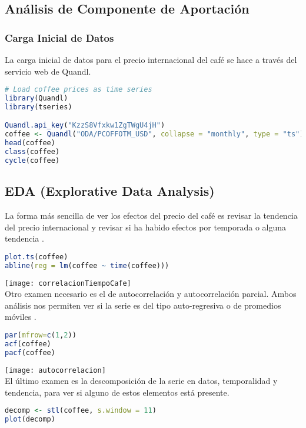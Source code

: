 \subsection{Análisis de Componente de Aportación}

\subsubsection{Carga Inicial de Datos}
La carga inicial de datos para el precio internacional del café se hace a través del servicio web de Quandl.

\begin{lstlisting}[language=R]
# Load coffee prices as time series
library(Quandl)
library(tseries)

Quandl.api_key("KzzS8Vfxkw1ZgTWgU4jH")
coffee <- Quandl("ODA/PCOFFOTM_USD", collapse = "monthly", type = "ts")
head(coffee)
class(coffee)
cycle(coffee)
\end{lstlisting}

\subsection{EDA (Explorative Data Analysis)}
La forma más sencilla de ver los efectos del precio del café es revisar la tendencia del precio internacional y revisar si ha habido efectos por temporada o alguna tendencia \cite{daroczi}.

\begin{lstlisting}[language=R]
plot.ts(coffee)
abline(reg = lm(coffee ~ time(coffee)))
\end{lstlisting}

\texttt{[image: correlacionTiempoCafe]}\\

Otro examen necesario es el de autocorrelación y autocorrelación parcial. Ambos análisis nos permiten ver si la serie es del tipo auto-regresiva o de promedios móviles \cite{hyndman}.

\begin{lstlisting}[language=R]
par(mfrow=c(1,2))
acf(coffee)
pacf(coffee)
\end{lstlisting}

\texttt{[image: autocorrelacion]}\\

El último examen es la descomposición de la serie en datos, temporalidad y tendencia, para ver si alguno de estos elementos está presente.

\begin{lstlisting}[language=R]
decomp <- stl(coffee, s.window = 11)
plot(decomp)
\end{lstlisting}

